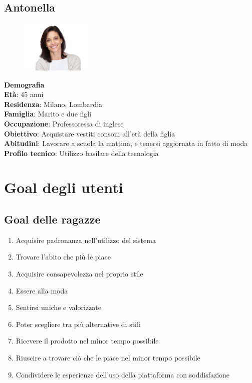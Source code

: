 \documentclass[12pt,a4paper]{report}
\begin{document}
\subsection*{Antonella}
\begin{figure}
  \centering
    \includegraphics[width=0.3\textwidth]{"Images Latex/Personas/Antonella"}
\end{figure}
\textbf{Demografia}\\
\indent \textbf{Età}: 45 anni\\
\indent \textbf{Residenza}: Milano, Lombardia\\
\indent \textbf{Famiglia}: Marito e due figli\\
\indent \textbf{Occupazione}: Professoressa di inglese\\
\textbf{Obiettivo}: Acquistare vestiti consoni all'età della figlia\\
\textbf{Abitudini}: Lavorare a scuola la mattina, e tenersi aggiornata in fatto di moda\\
\textbf{Profilo tecnico}: Utilizzo basilare della tecnologia\\

\section{Goal degli utenti}
\subsection*{Goal delle ragazze}
\begin{enumerate}
  \item Acquisire padronanza nell'utilizzo del sistema
  \item Trovare l'abito che più le piace
  \item Acquisire consapevolezza nel proprio stile
  \item Essere alla moda
  \item Sentirsi uniche e valorizzate
  \item Poter scegliere tra più alternative di stili
  \item Ricevere il prodotto nel minor tempo possibile
  \item Riuscire a trovare ciò che le piace nel minor tempo possibile
  \item Condividere le esperienze dell'uso della piattaforma con soddisfazione
\end{enumerate}
\end{document}
